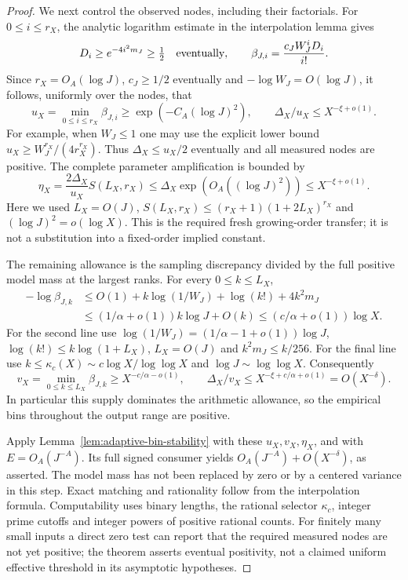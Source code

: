 \documentclass[11pt]{article}
\theoremstyle{definition}
\begin{document}
\begin{proof}
We next control the observed nodes, including their factorials.
For $0\le i\le r_X$, the analytic logarithm estimate in the
interpolation lemma gives
\[
 D_i\ge e^{-4i^2m_J}\ge\tfrac12
 \quad\hbox{eventually},\qquad
 \beta_{J,i}=\frac{c_JW_J^iD_i}{i!}.
\]
Since $r_X=O_A(\log J)$, $c_J\ge1/2$ eventually and
$-\log W_J=O(\log J)$, it follows, uniformly over the nodes,
that
\begin{equation}
 u_X=\min_{0\le i\le r_X}\beta_{J,i}
            \ge \exp(-C_A(\log J)^2),\qquad
             \Delta_X/u_X\le X^{-\xi+o(1)}.
 \label{eq:adaptive-bin-growing-node-supply}
\end{equation}
For example, when $W_J\le1$ one may use the explicit lower
bound $u_X\ge W_J^{r_X}/(4r_X^{r_X})$.
Thus $\Delta_X\le u_X/2$ eventually and all measured nodes
are positive.
The complete parameter amplification is bounded by
\begin{equation}
 \eta_X=\frac{2\Delta_X}{u_X}S(L_X,r_X)
       \le \Delta_X\exp(O_A((\log J)^2))
       \le X^{-\xi+o(1)}.
 \label{eq:adaptive-bin-growing-parameter-budget}
\end{equation}
Here we used $L_X=O(J)$,
$S(L_X,r_X)\le(r_X+1)(1+2L_X)^{r_X}$ and
$(\log J)^2=o(\log X)$.
This is the required fresh growing-order transfer; it is
not a substitution into a fixed-order implied constant.

The remaining allowance is the sampling discrepancy divided
by the full positive model mass at the largest ranks.
For every $0\le k\le L_X$,
\[
 \begin{aligned}
 -\log\beta_{J,k}
  &\le O(1)+k\log(1/W_J)+\log(k!)+4k^2m_J\\
  &\le (1/\alpha+o(1))k\log J+O(k)
   \le(c/\alpha+o(1))\log X .
 \end{aligned}
\]
For the second line use
$\log(1/W_J)=(1/\alpha-1+o(1))\log J$,
$\log(k!)\le k\log(1+L_X)$,
$L_X=O(J)$ and $k^2m_J\le k/256$.
For the final line use
$k\le\kappa_c(X)\sim c\log X/\log\log X$
and $\log J\sim\log\log X$.
Consequently
\begin{equation}
 v_X=\min_{0\le k\le L_X}\beta_{J,k}
        \ge X^{-c/\alpha-o(1)},\qquad
 \Delta_X/v_X\le X^{-\xi+c/\alpha+o(1)}
                                      =O(X^{-\delta}).
 \label{eq:adaptive-bin-full-positive-supply}
\end{equation}
In particular this supply dominates the arithmetic allowance,
so the empirical bins throughout the output range are positive.

Apply Lemma~\ref{lem:adaptive-bin-stability} with these
$u_X,v_X,\eta_X$, and with
$E=O_A(J^{-A})$.
Its full signed consumer yields
$O_A(J^{-A})+O(X^{-\delta})$, as asserted.
The model mass has not been replaced by zero or by a centered
variance in this step.
Exact matching and rationality follow from the interpolation
formula.
Computability uses binary lengths, the rational selector
$\kappa_c$, integer prime cutoffs and integer powers of positive
rational counts.
For finitely many small inputs a direct zero test can report
that the required measured nodes are not yet positive;
the theorem asserts eventual positivity, not a claimed
uniform effective threshold in its asymptotic hypotheses.
\end{proof}
\end{document}
